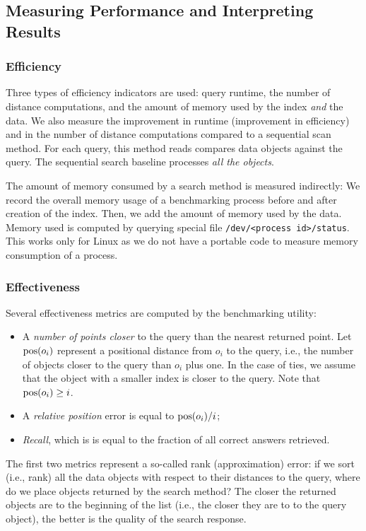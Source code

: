 \documentclass[runningheads,a4paper]{llncs}
\newcommand{\ttt}[1]{\texttt{#1}}
\newcommand{\pos}{\mbox{\rm pos}}
\begin{document}
\subsection{Measuring Performance and Interpreting Results}\label{SectionMeasurePerf}
\subsubsection{Efficiency}
Three types of efficiency indicators are used: query runtime, the number of distance computations,
and the amount of memory used by the index \emph{and} the data.
We also measure the improvement in runtime (improvement in efficiency) 
and in the number of distance computations compared to a sequential scan method. 
For each query, this method reads compares data objects against the query.
The sequential search baseline processes \emph{all the objects}. 

The amount of memory consumed by a search method is measured indirectly: 
We record the overall memory usage of a benchmarking process before and after creation of the index. Then, we add the amount of memory used by the data.
Memory used is computed by querying special file \ttt{/dev/<process id>/status}. 
This works only for Linux as we do not have a portable code to measure memory consumption of a process.

\subsubsection{Effectiveness}

Several effectiveness metrics are computed by the benchmarking utility:
\begin{itemize}
\item  A \emph{number of points closer} to the query than the nearest returned point.
Let $\pos(o_i)$ represent a positional distance from $o_i$ to the query, 
i.e., the number of objects closer to the query than $o_i$ plus one.
In the case of ties, we assume that the object with a smaller index is closer to the query.
Note that $\pos(o_i) \ge i$.
\item A \emph{relative position} error is equal to $\pos(o_i)/i$;
\item \emph{Recall},  which is is equal to the fraction of all correct answers retrieved.
\end{itemize}
The first two metrics represent a so-called rank (approximation) error:
if we sort (i.e., rank) all the data objects with respect to their distances to the query,
where do we place objects returned by the search method?
The closer the returned objects are to the beginning of the list (i.e., 
the closer they are to to the query object), the better is the quality of the search response.
\end{document}
